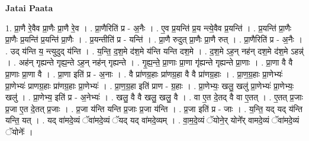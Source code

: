\documentclass[17pt]{extarticle}
\begin{document}
\textbf{Jatai Paata} \newline

1. प्रा॒णै रे॒वैव प्रा॒णैः प्रा॒णै रे॒व । . प्रा॒णैरिति॑ प्र - अ॒नैः । . ए॒व प्र॒यन्ति॑ प्र॒य न्त्ये॒वैव प्र॒यन्ति॑ । . प्र॒यन्ति॑ प्रा॒णैः प्रा॒णैः प्र॒यन्ति॑ प्र॒यन्ति॑ प्रा॒णैः । . प्र॒यन्तीति॑ प्र - यन्ति॑ । . प्रा॒णै रुदुत् प्रा॒णैः प्रा॒णै रुत् । . प्रा॒णैरिति॑ प्र - अ॒नैः । . उद् य॑न्ति य॒ न्त्युदुद् य॑न्ति । . य॒न्ति॒ द॒श॒मे द॑श॒मे य॑न्ति यन्ति दश॒मे । . द॒श॒मे ऽह॒न् नह॑न् दश॒मे द॑श॒मे ऽहन्न्॑ । . अह॑न् गृह्यन्ते गृह्य॒न्ते ऽह॒न् नह॑न् गृह्यन्ते । . गृ॒ह्य॒न्ते॒ प्रा॒णाः प्रा॒णा गृ॑ह्यन्ते गृह्यन्ते प्रा॒णाः । . प्रा॒णा वै वै प्रा॒णाः प्रा॒णा वै । . प्रा॒णा इति॑ प्र - अ॒नाः । . वै प्रा॑णग्र॒हाः प्रा॑णग्र॒हा वै वै प्रा॑णग्र॒हाः । . प्रा॒ण॒ग्र॒हाः प्रा॒णेभ्यः॑ प्रा॒णेभ्यः॑ प्राणग्र॒हाः प्रा॑णग्र॒हाः प्रा॒णेभ्यः॑ । . प्रा॒ण॒ग्र॒हा इति॑ प्राण - ग्र॒हाः । . प्रा॒णेभ्यः॒ खलु॒ खलु॑ प्रा॒णेभ्यः॑ प्रा॒णेभ्यः॒ खलु॑ । . प्रा॒णेभ्य॒ इति॑ प्र - अ॒नेभ्यः॑ । . खलु॒ वै वै खलु॒ खलु॒ वै । . वा ए॒त दे॒तद् वै वा ए॒तत् । . ए॒तत् प्र॒जाः प्र॒जा ए॒त दे॒तत् प्र॒जाः । . प्र॒जा य॑न्ति यन्ति प्र॒जाः प्र॒जा य॑न्ति । . प्र॒जा इति॑ प्र - जाः । . य॒न्ति॒ यद् यद् य॑न्ति यन्ति॒ यत् । . यद् वा॑मदे॒व्यं ॅवा॑मदे॒व्यं ॅयद् यद् वा॑मदे॒व्यम् । . वा॒म॒दे॒व्यं ॅयोने॒र् योने᳚र् वामदे॒व्यं ॅवा॑मदे॒व्यं ॅयोनेः᳚ । \newline
\end{document}
